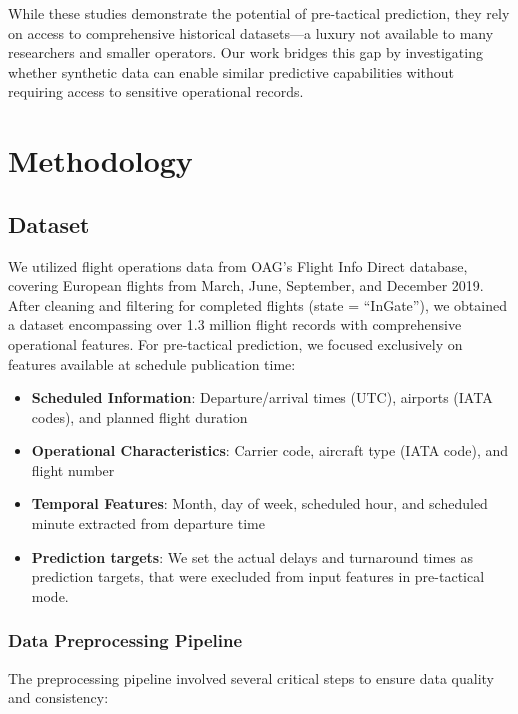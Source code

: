 \documentclass[conference]{IEEEtran}
\begin{document}
While these studies demonstrate the potential of pre-tactical prediction, they rely on access to comprehensive historical datasets—a luxury not available to many researchers and smaller operators. Our work bridges this gap by investigating whether synthetic data can enable similar predictive capabilities without requiring access to sensitive operational records.


\section{Methodology}

\subsection{Dataset}
We utilized flight operations data from OAG's Flight Info Direct database, covering European flights from March, June, September, and December 2019. After cleaning and filtering for completed flights (state = ``InGate''), we obtained a dataset encompassing over 1.3 million flight records with comprehensive operational features. For pre-tactical prediction, we focused exclusively on features available at schedule publication time:

\begin{itemize}
    \item \textbf{Scheduled Information}: Departure/arrival times (UTC), airports (IATA codes), and planned flight duration
    \item \textbf{Operational Characteristics}: Carrier code, aircraft type (IATA code), and flight number
    \item \textbf{Temporal Features}: Month, day of week, scheduled hour, and scheduled minute extracted from departure time
    \item \textbf{Prediction targets}: We set the actual delays and turnaround times as prediction targets, that were execluded from input features in pre-tactical mode. 
\end{itemize}

\subsubsection{Data Preprocessing Pipeline}
The preprocessing pipeline involved several critical steps to ensure data quality and consistency:
\end{document}
